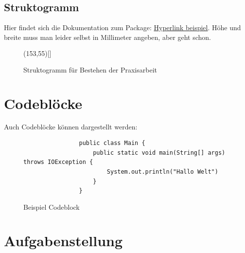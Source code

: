 \documentclass[12pt]{report}
\begin{document}
\subsection{Struktogramm}
Hier findet sich die Dokumentation zum Package: \href{https://augenbit.de/wiki/index.php?title=Struktogramme_mit_LaTeX}{Hyperlink beispiel}.
Höhe und breite muss man leider selbst in Millimeter angeben, aber geht schon.

\begin{figure}[h!]
	\begin{struktogramm}(153,55)[]
		
		\change %
			\forallinend
			\return{\sFalse}
		\ifend
	\end{struktogramm}
	\caption{Struktogramm für Bestehen der Praxisarbeit}
	\label{fig:StruktoBestehen}
\end{figure}

\pagebreak
\section{Codeblöcke}
Auch Codeblöcke können dargestellt werden:

\begin{figure}[h!]
	\centering
			\begin{lstlisting}
				public class Main {
					public static void main(String[] args) throws IOException {
						System.out.println("Hallo Welt")
					}
				}
			\end{lstlisting}
	\caption{Beispiel Codeblock}
	\label{fig:BspCodeblock}
\end{figure}


\pagebreak
\section{Aufgabenstellung}
\blindtext
\\
\\
\blindtext


\pagebreak
\end{document}
